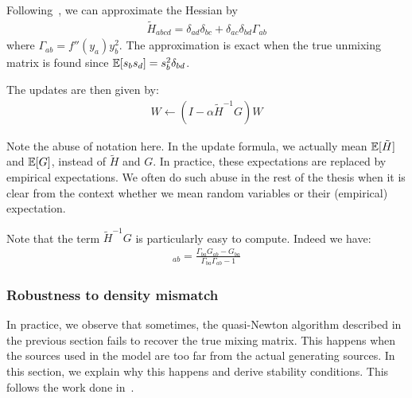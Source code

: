 Following~\cite{ablin2018faster}, we can approximate the Hessian by
\begin{align}
  \tilde{H}_{abcd} = \delta_{ad} \delta_{bc} + \delta_{ac} \delta_{bd} \Gamma_{ab}
\end{align}
where $\Gamma_{ab} = f''(y_a) y_b^2$.
The approximation is exact when the true unmixing matrix is found since $\mathbb{E}[s_b s_d] =  s_b^2\delta_{bd}$.

The updates are then given by:
\begin{align}
  W \leftarrow (I - \alpha \tilde{H}^{-1} G) W
\end{align}

Note the abuse of notation here. In the update formula, we actually mean
$\mathbb{E}[\tilde{H}]$ and $\mathbb{E}[G]$,
instead of $\tilde{H}$ and $G$.
In practice, these expectations are replaced by empirical expectations. We often do such abuse in the rest of the thesis when it is clear from the context whether we mean random variables or their (empirical) expectation. 

Note that the term $\tilde{H}^{-1} G$ is particularly easy to compute. Indeed we
have:
\begin{align}
[\tilde{H}^{-1} G]_{ab} = \frac{\Gamma_{ba} G_{ab} - G_{ba}}{\Gamma_{ba}
  \Gamma_{ab} - 1}
\end{align}

\subsubsection{Robustness to density mismatch}
In practice, we observe that sometimes, the quasi-Newton algorithm described in
the previous section fails to recover the true mixing matrix. This happens when the
sources used in the model are too far from the actual  generating sources.
%
In this section, we explain
why this happens and derive stability conditions. This follows the work done in~\cite{cardoso1998blind}.

